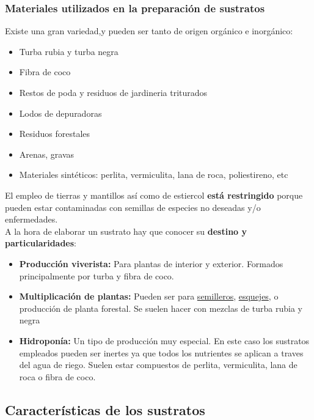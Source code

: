 \documentclass[a4paper,12pt,oneside]{article}
\begin{document}
\subsubsection{Materiales utilizados en la preparación de sustratos}
\label{sec:orge3dcef5}
Existe una gran variedad,y  pueden ser tanto de origen orgánico e inorgánico:
\begin{itemize}
\item Turba rubia y turba negra
\item Fibra de coco
\item Restos de poda y residuos de jardineria triturados
\item Lodos de depuradoras
\item Residuos forestales
\item Arenas, gravas
\item Materiales sintéticos: perlita, vermiculita, lana de roca, poliestireno, etc
\end{itemize}
El empleo de tierras y mantillos así como de estiercol \textbf{está restringido} porque
pueden estar contaminadas con semillas de especies no deseadas y/o
enfermedades.\\
A la hora de elaborar un sustrato hay que conocer su \textbf{destino y
particularidades}:\\
\begin{itemize}
\item \textbf{Producción viverista:} Para plantas de interior y exterior. Formados
principalmente por turba y fibra de coco.
\item \textbf{Multiplicación de plantas:} Pueden ser para \uline{semilleros}, \uline{esquejes}, o
producción de planta forestal. Se suelen hacer con mezclas de turba rubia y negra
\item \textbf{Hidroponía:} Un tipo de producción muy especial. En este caso los sustratos
empleados pueden ser inertes ya que todos los nutrientes se aplican a traves
del agua de riego. Suelen estar compuestos de perlita, vermiculita, lana de
roca o fibra de coco.
\end{itemize}
\subsection{Características de los sustratos}
\label{sec:org1394c37}
\end{document}
